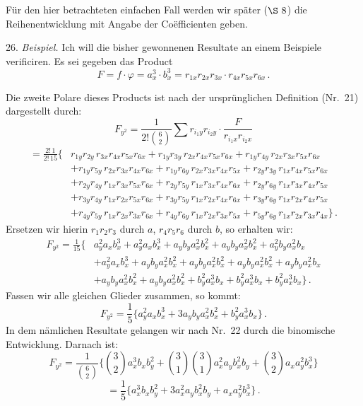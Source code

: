 Für den hier betrachteten einfachen Fall werden wir später ($\S~8$) die Reihenentwicklung mit Angabe der Co\"efficienten geben.

26. \textit{Beispiel.} Ich will die bisher gewonnenen Resultate an einem Beispiele verificiren. Es sei gegeben das Product
\[
F=f\cdot\varphi=a_x^3\cdot b_x^3=r_{1x}r_{2x}r_{3x}\cdot r_{4x}r_{5x}r_{6x}\,.
\]


Die zweite Polare dieses Products ist nach der ursprünglichen Definition (Nr.\ 21) dargestellt durch:
\[
F_{y^2}=\frac{1}{2!\binom{6}{2}}\sum r_{i_1y}r_{i_2y}\cdot\frac{F}{r_{i_1x}r_{i_2x}}
\]
\[
\begin{aligned}
=\frac{2!\,1}{2!\,15}\Big\{
&r_{1y}r_{2y}\,r_{3x}r_{4x}r_{5x}r_{6x}+r_{1y}r_{3y}\,r_{2x}r_{4x}r_{5x}r_{6x}+r_{1y}r_{4y}\,r_{2x}r_{3x}r_{5x}r_{6x}\\
&+r_{1y}r_{5y}\,r_{2x}r_{3x}r_{4x}r_{6x}+r_{1y}r_{6y}\,r_{2x}r_{3x}r_{4x}r_{5x}+r_{2y}r_{3y}\,r_{1x}r_{4x}r_{5x}r_{6x}\\
&+r_{2y}r_{4y}\,r_{1x}r_{3x}r_{5x}r_{6x}+r_{2y}r_{5y}\,r_{1x}r_{3x}r_{4x}r_{6x}+r_{2y}r_{6y}\,r_{1x}r_{3x}r_{4x}r_{5x}\\
&+r_{3y}r_{4y}\,r_{1x}r_{2x}r_{5x}r_{6x}+r_{3y}r_{5y}\,r_{1x}r_{2x}r_{4x}r_{6x}+r_{3y}r_{6y}\,r_{1x}r_{2x}r_{4x}r_{5x}\\
&+r_{4y}r_{5y}\,r_{1x}r_{2x}r_{3x}r_{6x}+r_{4y}r_{6y}\,r_{1x}r_{2x}r_{3x}r_{5x}+r_{5y}r_{6y}\,r_{1x}r_{2x}r_{3x}r_{4x}
\Big\}\,.
\end{aligned}
\]
Ersetzen wir hierin $r_1r_2r_3$ durch $a$, $r_4r_5r_6$ durch $b$, so erhalten wir:
\[
\begin{aligned}
F_{y^2}=\frac{1}{15}\Big\{
&a_y^2a_xb_x^3+a_y^2a_xb_x^3+a_yb_ya_x^2b_x^2+a_yb_ya_x^2b_x^2+a_y^2b_ya_x^2b_x\\
&+a_y^2a_xb_x^3+a_yb_ya_x^2b_x^2+a_yb_ya_x^2b_x^2+a_yb_ya_x^2b_x^2+a_yb_ya_x^2b_x\\
&+a_yb_ya_x^2b_x^2+a_yb_ya_x^2b_x^2+b_y^2a_x^3b_x+b_y^2a_x^3b_x+b_y^2a_x^3b_x
\Big\}\,.
\end{aligned}
\]
Fassen wir alle gleichen Glieder zusammen, so kommt:
\[
F_{y^2}=\frac{1}{5}\Big\{a_y^2a_xb_x^3+3a_yb_ya_x^2b_x^2+b_y^2a_x^3b_x\Big\}\,.
\]
In dem nämlichen Resultate gelangen wir nach Nr.\ 22 durch die binomische Entwicklung. Darnach ist:
\[
F_{y^2}=\frac{1}{\binom{6}{2}}\Big\{\binom{3}{2}a_x^3b_xb_y^2+\binom{3}{1}\binom{3}{1}a_x^2a_yb_x^2b_y+\binom{3}{2}a_xa_y^2b_x^3\Big\}
\]
\[
=\frac{1}{5}\Big\{a_x^3b_xb_y^2+3a_x^2a_yb_x^2b_y+a_xa_y^2b_x^3\Big\}\,.
\]
